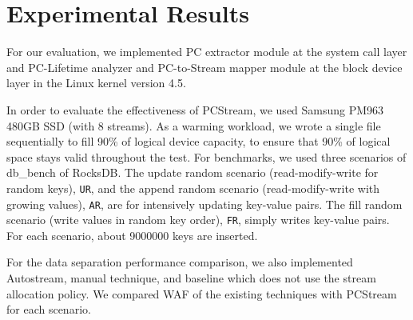 \section{Experimental Results}
For our evaluation, we implemented PC extractor module at the 
system call layer 
and PC-Lifetime analyzer and PC-to-Stream mapper module 
at the block device layer in the Linux kernel version 4.5.

In order to evaluate the effectiveness of {\sf PCStream},
we used Samsung PM963 480GB SSD (with 8 streams).
As a warming workload, we wrote a single file sequentially to fill 90\%
of logical device capacity, to ensure that 90\% of logical space stays valid
throughout the test.
For benchmarks, we used three scenarios of db\_bench of RocksDB.
The update random scenario (read-modify-write for random keys), {\tt UR}, and 
the append random scenario (read-modify-write with growing values), {\tt AR}, are
for intensively updating key-value pairs.
The fill random scenario (write values in random key order), {\tt FR}, simply writes key-value pairs.
For each scenario, about 9000000 keys are inserted.

\begin{comment}
In order to evaluate the effectiveness of {\sf PCStream},
we implemented the multi-stream feature and substream concept
to the in-house SSD emulator
based on the open flash development platform~\cite{AMF}.
The number of streams was set to 8 for the evaluation.
The SSD emulator was 8GB with four channels with four ways, and 
the number of blocks per a parallel unit was 512 and
the number of pages per block was 256 with 4KB-sized page.
Due to the limited capacity of the emulator, 
we scaled down RocksDB configuration.
The base file size is set to 8 MB
with the size of key-value is 8 KB and the number of levels was set to 4.
However, the size of level multiplier is remained to be 10 as an usual setting,
which means the size of the next level is 10 times larger than previous level,
to maintain the level access patterns during the compaction.
\end{comment}


For the data separation performance comparison, 
we also implemented Autostream, manual technique, and
baseline which does not use the stream allocation policy.
We compared WAF of the existing techniques with {\sf PCStream}
for each scenario.




